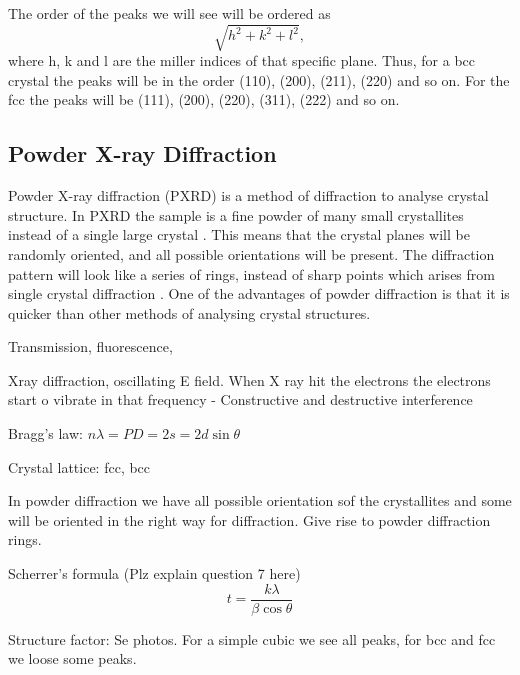 The order of the peaks we will see will be ordered as 
\begin{equation}
    \sqrt{h^2+k^2+l^2},
    \label{eq:ordering}
\end{equation}  
where h, k and l are the miller indices of that specific plane. Thus, for a bcc crystal the peaks will be in the order (110), (200), (211), (220) and so on. For the fcc the peaks will be (111), (200), (220), (311), (222) and so on.  

\subsection{Powder X-ray Diffraction}
Powder X-ray diffraction (PXRD) is a method of diffraction to analyse crystal structure. In PXRD the sample is a fine powder of many small crystallites instead of a single large crystal \cite{hofmann2015}. This means that the crystal planes will be randomly oriented, and all possible orientations will be present. The diffraction pattern will look like a series of rings, instead of sharp points which arises from single crystal diffraction \cite{hofmann2015}. One of the advantages of powder diffraction is that it is quicker than other methods of analysing crystal structures.


Transmission, fluorescence, 

Xray diffraction, oscillating E field. When X ray hit the electrons the electrons start o vibrate in that frequency
- Constructive and destructive interference 

Bragg's law: $n\lambda=PD=2s=2d\sin\theta$

Crystal lattice: fcc, bcc


In powder diffraction we have all possible orientation sof the crystallites and some will be oriented in the right way for diffraction. Give rise to powder diffraction rings. 


Scherrer's formula (Plz explain question 7 here)
\begin{equation}
    t=\frac{k\lambda}{\beta\cos\theta}
    \label{eq:Scherre}
\end{equation}


Structure factor: Se photos. For a simple cubic we see all peaks, for bcc and fcc we loose some peaks. 

